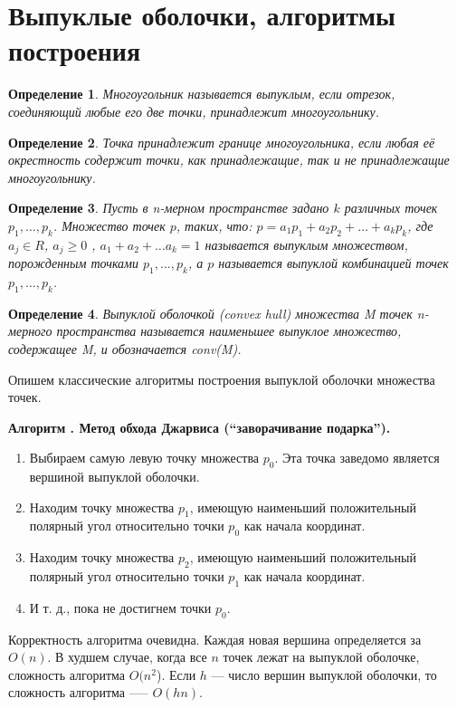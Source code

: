 \documentclass[a4paper]{article}
\renewcommand{\ge}{\geqslant}
\newcounter{algorithm}
\newenvironment{algorithm}[1]{\par\smallskip\noindent\refstepcounter{algorithm}%
  \textbf{Алгоритм \arabic{algorithm}. #1}\begin{enumerate}}{\end{enumerate}}
\newtheorem{define}{Определение}
\begin{document}
\section{Выпуклые оболочки, алгоритмы построения}
\begin{define}
  Многоугольник называется выпуклым, если отрезок, соединяющий любые
  его две точки, принадлежит многоугольнику.
\end{define}
\begin{define}
  Точка принадлежит границе многоугольника, если любая её окрестность
  содержит точки, как принадлежащие, так и не принадлежащие
  многоугольнику.
\end{define}
\begin{define}
  Пусть в n-мерном пространстве задано $k$ различных точек $p_1, \ldots, p_k$.
  Множество точек $p$, таких, что: $p = a_1p_1 + a_2p_2 + \ldots +
  a_kp_k$, где $a_j \in R$,
  $a_j \ge 0$ , $a_1 + a_2 + \ldots a_k = 1$ называется выпуклым множеством,
  порожденным точками $p_1, \ldots, p_k$, а $p$ называется выпуклой комбинацией
  точек $p_1, \ldots, p_k$.
\end{define}
\begin{define}
  Выпуклой оболочкой (convex hull) множества M точек n-мерного
  пространства называется наименьшее выпуклое множество, содержащее M,
  и обозначается conv(M).
\end{define}

Опишем классические алгоритмы построения выпуклой оболочки множества
точек.

\begin{algorithm}{Метод обхода Джарвиса (``заворачивание подарка'').}
\item Выбираем самую левую точку множества $p_0$. Эта точка заведомо
  является вершиной выпуклой оболочки.
\item Находим точку множества $p_1$, имеющую наименьший положительный
  полярный угол относительно точки $p_0$ как начала координат.
\item Находим точку множества $p_2$, имеющую наименьший положительный
  полярный угол относительно точки $p_1$ как начала координат.
\item И т. д., пока не достигнем точки $p_0$.
\end{algorithm}

Корректность алгоритма очевидна. Каждая новая вершина определяется за
$O(n)$. В худшем случае, когда все $n$ точек лежат на выпуклой оболочке,
сложность алгоритма $O(n^2$). Если $h$ --- число вершин выпуклой оболочки, то
сложность алгоритма --— $O(hn)$.
\end{document}
